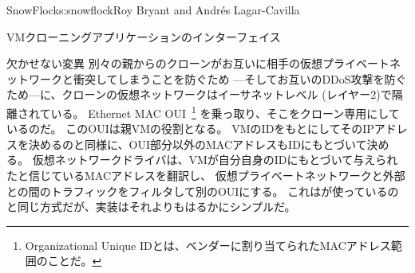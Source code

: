 \begin{aosachapter}{SnowFlock}{s:snowflock}{Roy Bryant and Andr\'e{s} Lagar-Cavilla}
\begin{aosasect1}{VMクローニングアプリケーションのインターフェイス}
\begin{aosasect2}{欠かせない変異}
別々の親からのクローンがお互いに相手の仮想プライベートネットワークと衝突してしまうことを防ぐため
---そしてお互いのDDoS攻撃を防ぐため---に、クローンの仮想ネットワークはイーサネットレベル
(レイヤー2)で隔離されている。
Ethernet MAC OUI~\footnote{Organizational Unique IDとは、ベンダーに割り当てられたMACアドレス範囲のことだ。}
を乗っ取り、そこをクローン専用にしているのだ。
このOUIは親VMの役割となる。
VMのIDをもとにしてそのIPアドレスを決めるのと同様に、OUI部分以外のMACアドレスもIDにもとづいて決める。
仮想ネットワークドライバは、VMが自分自身のIDにもとづいて与えられたと信じているMACアドレスを翻訳し、
仮想プライベートネットワークと外部との間のトラフィックをフィルタして別のOUIにする。
これはが使っているのと同じ方式だが、実装はそれよりもはるかにシンプルだ。


\end{aosasect2}
\end{aosasect1}
\end{aosachapter}
